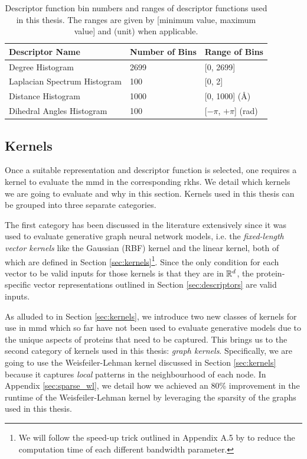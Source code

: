 \begin{table}
  \centering
  \begin{tabular}{lll}
    \toprule
    \textbf{Descriptor Name} & \textbf{Number of Bins} & \textbf{Range of Bins} \\
    \midrule
    Degree Histogram & 2699 & [0, 2699] \\
    Laplacian Spectrum Histogram & 100 & [0, 2] \\
    Distance Histogram & 1000 & [0, 1000] (\si{\angstrom}) \\
    Dihedral Angles Histogram & 100 & [$-\pi$, $+\pi$] (rad) \\
    \bottomrule
  \end{tabular}
  \caption[Descriptor function bin numbers and ranges of descriptor functions
  used in this thesis.]{Descriptor function bin numbers and ranges of descriptor functions
    used in this thesis. The ranges are given by
    [minimum value, maximum value] and (unit) when applicable.}
  \label{tab:descriptor_function_setup}
\end{table}

\subsection{Kernels}\label{sec:methods_kernels}
Once a suitable representation and descriptor function is selected, one requires
a kernel to evaluate the \gls{mmd} in the corresponding \acrshort{rkhs}. We
detail which kernels we are going to evaluate and why in this section. Kernels
used in this thesis can be grouped into three separate categories.

The first category has been discussed in the literature extensively since it was
used to evaluate generative graph neural network models, i.e. the
\emph{fixed-length vector kernels} like the Gaussian (RBF) kernel and the linear
kernel, both of which are defined in Section \ref{sec:kernels}\footnote{We will
  follow the speed-up trick outlined in Appendix A.5 by \cite{obray2022evaluation}
  to reduce the computation time of each different bandwidth parameter.}. Since the only
condition for each vector to be valid inputs for those kernels is that they are
in $\mathbb{R}^d$, the protein-specific vector representations outlined in Section
\ref{sec:descriptors} are valid inputs.

As alluded to in Section \ref{sec:kernels}, we introduce two new classes of
kernels for use in \gls{mmd} which so far have not been used to evaluate generative
models due to the unique aspects of proteins that need to be captured. This
brings us to the second category of kernels used in this thesis: \emph{graph kernels}.
Specifically, we are going to use the Weisfeiler-Lehman kernel discussed in
Section \ref{sec:kernels} because it captures \emph{local} patterns in the
neighbourhood of each node. In Appendix \ref{sec:sparse_wl}, we detail how we
achieved an 80\% improvement in the runtime of the Weisfeiler-Lehman kernel by
leveraging the sparsity of the graphs used in this thesis.

